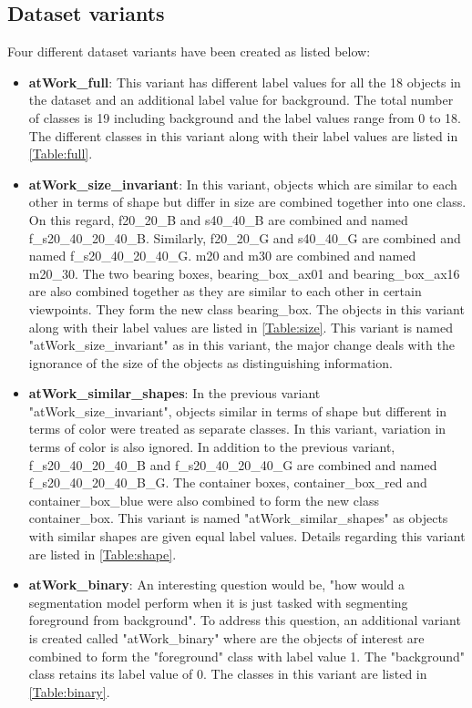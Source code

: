 	\subsection{Dataset variants}
	\label{section:analysis}
	Four different dataset variants have been created as listed below:
	\begin{itemize}
		\item \textbf{atWork\_full}: This variant has different label values for all the 18 objects in the dataset and an additional label value for background. The total number of classes is 19 including background and the label values range from 0 to 18. The different classes in this variant along with their label values are listed in \ref{Table:full}.
		\item \textbf{atWork\_size\_invariant}: In this variant, objects which are similar to each other in terms of shape but differ in size are combined together into one class. On this regard, f20\_20\_B and s40\_40\_B are combined and named f\_s20\_40\_20\_40\_B. Similarly, f20\_20\_G and s40\_40\_G are combined and named f\_s20\_40\_20\_40\_G. m20 and m30 are combined and named m20\_30. The two bearing boxes, bearing\_box\_ax01 and bearing\_box\_ax16 are also combined together as they are similar to each other in certain viewpoints. They form the new class bearing\_box. The objects in this variant along with their label values are listed in \ref{Table:size}. This variant is named "atWork\_size\_invariant" as in this variant, the major change deals with the ignorance of the size of the objects as distinguishing information.
		\item \textbf{atWork\_similar\_shapes}: In the previous variant "atWork\_size\_invariant", objects similar in terms of shape but different in terms of color were treated as separate classes. In this variant, variation in terms of color is also ignored. In addition to the previous variant, f\_s20\_40\_20\_40\_B and f\_s20\_40\_20\_40\_G are combined and named f\_s20\_40\_20\_40\_B\_G. The container boxes, container\_box\_red and container\_box\_blue were also combined to form the new class container\_box. This variant is named "atWork\_similar\_shapes" as objects with similar shapes are given equal label values. Details regarding this variant are listed in \ref{Table:shape}.
		\item \textbf{atWork\_binary}: An interesting question would be, "how would a segmentation model perform when it is just tasked with segmenting foreground from background". To address this question, an additional variant is created called "atWork\_binary" where are the objects of interest are combined to form the "foreground" class with label value 1. The "background" class retains its label value of 0. The classes in this variant are listed in \ref{Table:binary}.
		

\end{itemize}
